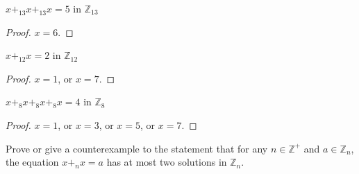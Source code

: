 \newpage
\begin{exercise}
    $x {+}_{13} x {+}_{13} x = 5$ in $\mathbb{Z}_{13}$
\end{exercise}

\begin{proof}
    $x = 6$.
\end{proof}

\newpage
\begin{exercise}
    $x {+}_{12} x = 2$ in $\mathbb{Z}_{12}$
\end{exercise}

\begin{proof}
    $x = 1$, or $x = 7$.
\end{proof}

\newpage
\begin{exercise}
    $x {+}_{8} x {+}_{8} x {+}_{8} x = 4$ in $\mathbb{Z}_{8}$
\end{exercise}

\begin{proof}
    $x = 1$, or $x = 3$, or $x = 5$, or $x = 7$.
\end{proof}

\newpage
\begin{exercise}
    Prove or give a counterexample to the statement that for any $n\in\mathbb{Z}^{+}$ and $a\in\mathbb{Z}_{n}$, the equation $x {+}_{n} x = a$ has at most two solutions in $\mathbb{Z}_{n}$.
\end{exercise}

